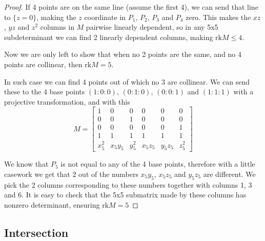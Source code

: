 \documentclass[a4paper]{article}
\begin{document}
\begin{proof}
    If 4 points are on the same line (assume the first 4), we can send that line to $\{z=0\}$, making the $z$ coordinate in $P_1$, $P_2$, $P_3$ and $P_4$ zero. This makes the $xz$, $yz$ and $z^2$ columns in $M$ pairwise linearly dependent, so in any 5x5 subdeterminant we can find 2 linearly dependent columns, making $\mathrm{rk}M\le 4$.

    Now we are only left to show that when no 2 points are the same, and no 4 points are collinear, then $\mathrm{rk}M= 5$.

    In such case we can find 4 points out of which no 3 are collinear. We can send these to the 4 base points $(1:0:0)$, $(0:1:0)$, $(0:0:1)$ and $(1:1:1)$ with a projective transformation, and with this
    $$M=
    \begin{bmatrix}
    1 & 0 & 0 & 0 & 0 & 0 \\[4pt]
    0 & 0 & 1 & 0 & 0 & 0 \\[4pt]
    0 & 0 & 0 & 0 & 0 & 1 \\[4pt]
    1 & 1 & 1 & 1 & 1 & 1 \\[4pt]
    x_5^2 & x_5 y_5 & y_5^2 & x_5 z_5 & y_5 z_5 & z_5^2
    \end{bmatrix}$$

    We know that $P_5$ is not equal to any of the 4 base points, therefore with a little casework we get that 2 out of the numbers $x_5 y_5$, $x_5 z_5$ and $y_5 z_5$ are different. We pick the 2 columns corresponding to these numbers together with columns 1, 3 and 6. It is easy to check that the 5x5 submatrix made by these columns has nonzero determinant, ensuring $\mathrm{rk}M= 5$
\end{proof}

\subsection{Intersection}
\end{document}
